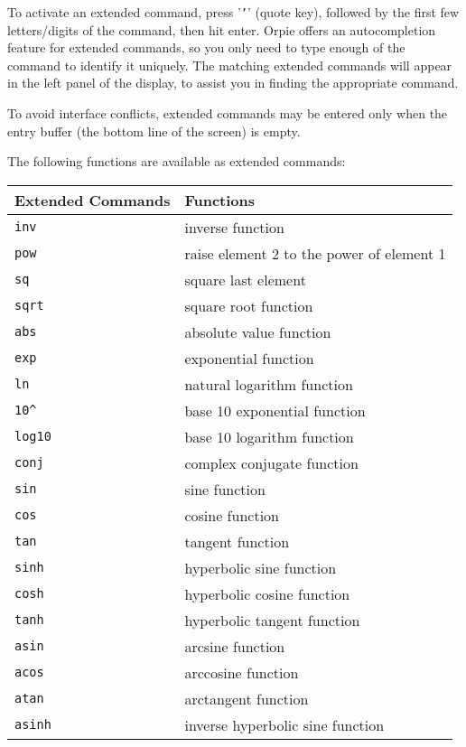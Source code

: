 \documentclass[11pt,notitlepage]{article}
\begin{document}
To activate an extended command, press '{\tt '}' (quote key), followed by the
first few letters/digits of the command, then hit enter.  Orpie offers an
autocompletion feature for extended commands, so you only need to type enough of
the command to identify it uniquely.  The matching extended commands will appear
in the left panel of the display, to assist you in finding the appropriate
command.

To avoid interface conflicts, extended commands may be entered only when the
entry buffer (the bottom line of the screen) is empty.

The following functions are available as extended commands:
\begin{center}
   \begin{tabular}[t]{|l|l|}
      \hline Extended Commands & Functions \\
      \hline
      {\tt inv} & inverse function \\
      {\tt pow} & raise element 2 to the power of element 1 \\
      {\tt sq}  & square last element \\
      {\tt sqrt} & square root function \\
      {\tt abs } & absolute value function \\
      {\tt exp } & exponential function \\
      {\tt ln } & natural logarithm function \\
      {\tt 10\^{} } & base 10 exponential function \\
      {\tt log10 } & base 10 logarithm function \\
      {\tt conj } & complex conjugate function \\
      {\tt sin} & sine function \\
      {\tt cos} & cosine function \\
      {\tt tan} & tangent function \\
      {\tt sinh} & hyperbolic sine function \\
      {\tt cosh} & hyperbolic cosine function \\
      {\tt tanh} & hyperbolic tangent function \\
      {\tt asin} & arcsine function \\
      {\tt acos} & arccosine function \\
      {\tt atan} & arctangent function \\
      {\tt asinh} & inverse hyperbolic sine function \\

\end{tabular}
\end{center}
\end{document}
